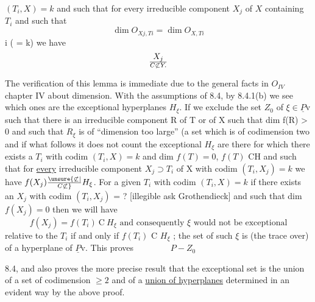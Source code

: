 
$(T_i, X) = k$ and such that for every irreducible component $X_j$ of $X$
containing $T_i$ and such that
\[ \dim O_{Xj, Ti} = \dim O_{X, Ti} \]
i ( = k) we have
\[ X_j \over{C}{\not\subset} Y. \]

The verification of this lemma is immediate due to the general
facts in $O_{IV}$ chapter IV about dimension.  With the assumptions of
8.4, by 8.4.1(b) we see which ones are the exceptional hyperplanes
$H_\xi$.  If we exclude the set $Z_0$ of $\xi \in \underline{P}\mathrm{v}$ such that there is an
irreducible component R of T or of X such that dim f(R) > 0 and
such that $R_\xi$ is of ``dimension too large'' (a set which is of
codimension two and if what follows it does not count the
exceptional $H_\xi$ are there for which there exists a $T_i$ with codim
$(T_i, X) = k$ and dim $f(T) = 0$, $f(T)$ CH and such that for \uline{every}
irreducible component $X_j \supset T_i$ of X with codim $(T_i, X_j) = k$ we have
$f(X_j) \unsure{\not\subset|\over{C}{\not\subset}} H_\xi$.  For a given $T_i$ with codim $(T_i, X) = k$ if there exists
an $X_j$ with codim $(T_i, X_j)$ = ? [illegible ask Grothendieck]
and such that dim $f(X_j) = 0$ then we will have
\[ f(X_j) = f(T_i)\ \mathrm{C}\ H_\xi \text{ and consequently } \xi \text{ would not be exceptional} \]
relative to the $T_i$ if and only if $f(T_i)$ C $H_\xi$ ; the set of such $\xi$ is
(the trace over) of a hyperplane of $\underline{P}\mathrm{v}$.  This proves
$\qquad\qquad P - Z_0$

8.4, and also proves the more precise result that the exceptional
set is the union of a set of codimension $\geq 2$ and of a \uline{union of
hyperplanes} determined in an evident way by the above proof.
